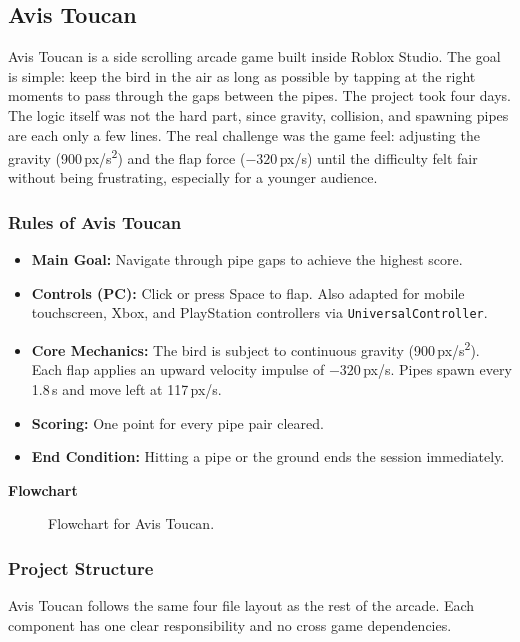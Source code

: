 \documentclass[12pt,letterpaper]{article}
\begin{document}
\subsection{Avis Toucan}

Avis Toucan is a side scrolling arcade game built inside Roblox Studio. The goal is simple: keep the bird in the air as long as possible by tapping at the right moments to pass through the gaps between the pipes. The project took four days. The logic itself was not the hard part, since gravity, collision, and spawning pipes are each only a few lines. The real challenge was the game feel: adjusting the gravity (900\,px/s\textsuperscript{2}) and the flap force ($-320$\,px/s) until the difficulty felt fair without being frustrating, especially for a younger audience.

\subsubsection{Rules of Avis Toucan}
\begin{itemize}
  \item \textbf{Main Goal:} Navigate through pipe gaps to achieve the highest score.
  \item \textbf{Controls (PC):} Click or press Space to flap. Also adapted for mobile touchscreen, Xbox, and PlayStation controllers via \texttt{UniversalController}.
  \item \textbf{Core Mechanics:} The bird is subject to continuous gravity (900\,px/s\textsuperscript{2}). Each flap applies an upward velocity impulse of $-320$\,px/s. Pipes spawn every 1.8\,s and move left at 117\,px/s.
  \item \textbf{Scoring:} One point for every pipe pair cleared.
  \item \textbf{End Condition:} Hitting a pipe or the ground ends the session immediately.
\end{itemize}

\textbf{Flowchart}
\begin{figure}[H]
  \centering
  
  \caption{Flowchart for Avis Toucan.}
  \label{fig:avistoucan_flow}
\end{figure}

\subsubsection{Project Structure}

Avis Toucan follows the same four file layout as the rest of the arcade. Each component has one clear responsibility and no cross game dependencies.
\end{document}
